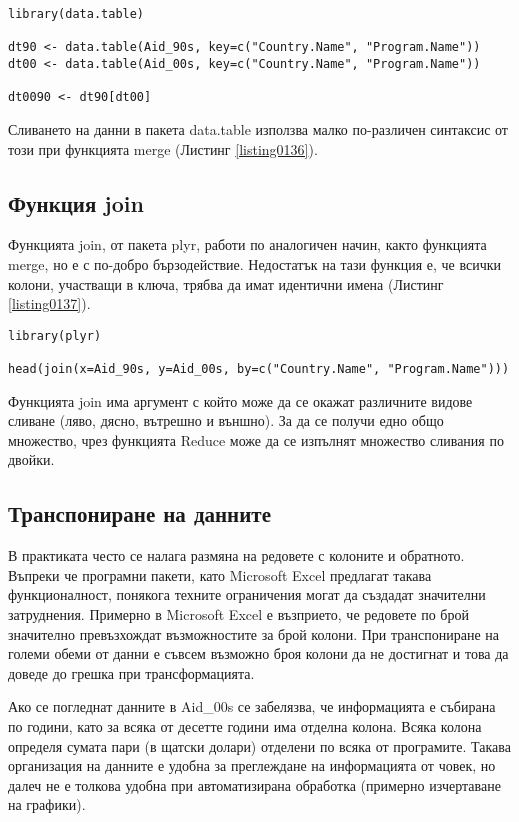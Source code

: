 \begin{lstlisting}[caption=Сливане на данни при data.table, label=listing0136]
library(data.table)

dt90 <- data.table(Aid_90s, key=c("Country.Name", "Program.Name"))
dt00 <- data.table(Aid_00s, key=c("Country.Name", "Program.Name"))

dt0090 <- dt90[dt00]
\end{lstlisting}

Сливането на данни в пакета data.table използва малко по-различен синтаксис от този при функцията merge (Листинг \ref{listing0136}).

\subsection{Функция join}

Функцията join, от пакета plyr, работи по аналогичен начин, както функцията merge, но е с по-добро бързодействие. Недостатък на тази функция е, че всички колони, участващи в ключа, трябва да имат идентични имена (Листинг \ref{listing0137}). 

\begin{lstlisting}[caption=Сливане на данни с join, label=listing0137]
library(plyr)

head(join(x=Aid_90s, y=Aid_00s, by=c("Country.Name", "Program.Name")))
\end{lstlisting}

Функцията join има аргумент с който може да се окажат различните видове сливане (ляво, дясно, вътрешно и външно). За да се получи едно общо множество, чрез функцията Reduce може да се изпълнят множество сливания по двойки. 

\subsection{Транспониране на данните}

В практиката често се налага размяна на редовете с колоните и обратното. Въпреки че програмни пакети, като Microsoft Excel предлагат такава функционалност, понякога техните ограничения могат да създадат значителни затруднения. Примерно в Microsoft Excel е възприето, че редовете по брой значително превъзхождат възможностите за брой колони. При транспониране на големи обеми от данни е съвсем възможно броя колони да не достигнат и това да доведе до грешка при трансформацията. 

Ако се погледнат данните в Aid\_00s се забелязва, че информацията е събирана по години, като за всяка от десетте години има отделна колона. Всяка колона определя сумата пари (в щатски долари) отделени по всяка от програмите. Такава организация на данните е удобна за преглеждане на информацията от човек, но далеч не е толкова удобна при автоматизирана обработка (примерно изчертаване на графики).

